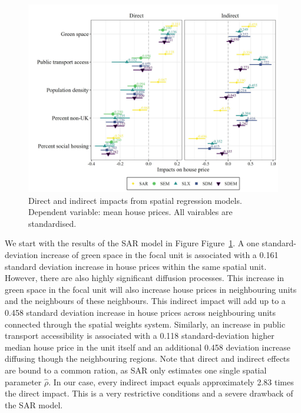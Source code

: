 \documentclass[
  letterpaper,
  DIV=11,
  numbers=noendperiod]{scrreprt}
\begin{document}
\begin{figure}

{\centering \includegraphics{fig/Coefplot.jpeg}

}

\caption{\label{fig-coefs}Direct and indirect impacts from spatial
regression models. Dependent variable: mean house prices. All vairables
are standardised.}

\end{figure}

We start with the results of the SAR model in Figure
Figure~\ref{fig-coefs}. A one standard-deviation increase of green space
in the focal unit is associated with a 0.161 standard deviation increase
in house prices within the same spatial unit. However, there are also
highly significant diffusion processes. This increase in green space in
the focal unit will also increase house prices in neighbouring units and
the neighbours of these neighbours. This indirect impact will add up to
a 0.458 standard deviation increase in house prices across neighbouring
units connected through the spatial weights system. Similarly, an
increase in public transport accessibility is associated with a 0.118
standard-deviation higher median house price in the unit itself and an
additional 0.458 deviation increase diffusing though the neighbouring
regions. Note that direct and indirect effects are bound to a common
ration, as SAR only estimates one single spatial parameter \(\hat\rho\).
In our case, every indirect impact equals approximately 2.83 times the
direct impact. This is a very restrictive conditions and a severe
drawback of the SAR model.
\end{document}
